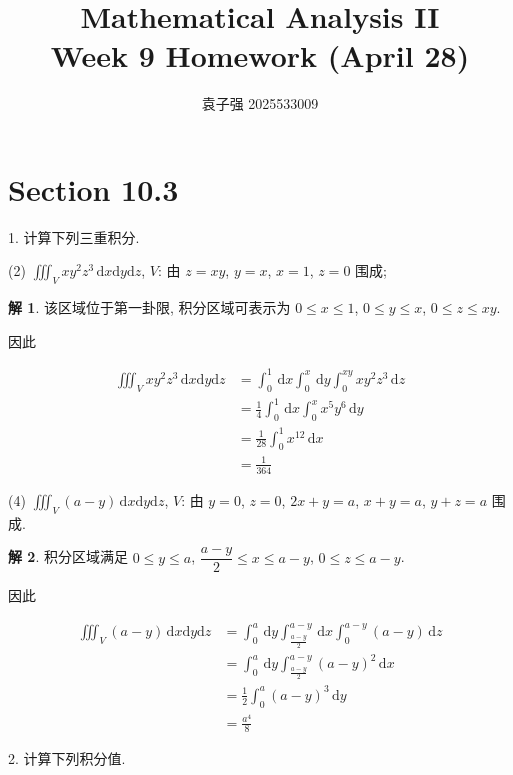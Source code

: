 \documentclass[a4paper,12pt]{article}
\title{Mathematical Analysis II\\Week 9 Homework (April 28)}
\author{袁子强\hspace{1cm} 2025533009}
\theoremstyle{definition}
\newtheorem*{sol}{解}
\begin{document}
\maketitle

\section*{Section 10.3}

1. 计算下列三重积分.

(2) $\displaystyle\iiint_V xy^2 z^3 \, \mathrm{d}x\mathrm{d}y\mathrm{d}z$, $V$: 由 $z=xy$, $y=x$, $x=1$, $z=0$ 围成;
\begin{sol}
    该区域位于第一卦限, 积分区域可表示为 $0\leq x\leq 1$, $0\leq y\leq x$, $0\leq z\leq xy$.

    因此

    \begin{align*}
        \iiint_V xy^2 z^3 \, \mathrm{d}x\mathrm{d}y\mathrm{d}z
         & =\int_0^1\,\mathrm{d}x\int_0^x\,\mathrm{d}y\int_0^{xy}xy^2z^3\,\mathrm{d}z \\
         & =\frac{1}{4}\int_0^1\,\mathrm{d}x\int_0^xx^5y^6\,\mathrm{d}y               \\
         & =\frac{1}{28}\int_0^1x^{12}\,\mathrm{d}x                                   \\
         & =\frac{1}{364}
    \end{align*}
\end{sol}
(4) $\displaystyle\iiint_V (a-y) \, \mathrm{d}x\mathrm{d}y\mathrm{d}z$, $V$: 由 $y=0$, $z=0$, $2x+y=a$, $x+y=a$, $y+z=a$ 围成.
\begin{sol}
    积分区域满足 $0\leq y\leq a$, $\dfrac{a-y}{2}\leq x\leq a-y$, $0\leq z\leq a-y$.

    因此

    \begin{align*}
        \iiint_V (a-y) \, \mathrm{d}x\mathrm{d}y\mathrm{d}z
         & =\int_0^a\,\mathrm{d}y\int_{\frac{a-y}{2}}^{a-y}\,\mathrm{d}x\int_0^{a-y}(a-y)\,\mathrm{d}z \\
         & =\int_0^a\,\mathrm{d}y\int_{\frac{a-y}{2}}^{a-y}(a-y)^2\,\mathrm{d}x                        \\
         & =\frac{1}{2}\int_0^a(a-y)^3\,\mathrm{d}y                                                    \\
         & =\frac{a^4}{8}
    \end{align*}
\end{sol}


2. 计算下列积分值.
\end{document}
